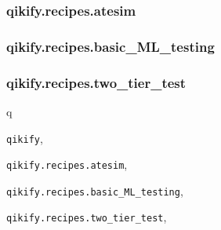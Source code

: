 \documentclass[letterpaper,10pt,english]{sphinxmanual}
\begin{document}
\subsubsection{qikify.recipes.atesim}
\label{generated/qikify.recipes.atesim:qikify-recipes-atesim}\label{generated/qikify.recipes.atesim::doc}\label{generated/qikify.recipes.atesim:module-qikify.recipes.atesim}

\subsubsection{qikify.recipes.basic\_ML\_testing}
\label{generated/qikify.recipes.basic_ML_testing:qikify-recipes-basic-ml-testing}\label{generated/qikify.recipes.basic_ML_testing:module-qikify.recipes.basic_ML_testing}\label{generated/qikify.recipes.basic_ML_testing::doc}

\subsubsection{qikify.recipes.two\_tier\_test}
\label{generated/qikify.recipes.two_tier_test:qikify-recipes-two-tier-test}\label{generated/qikify.recipes.two_tier_test:module-qikify.recipes.two_tier_test}\label{generated/qikify.recipes.two_tier_test::doc}

\renewcommand{\indexname}{Python Module Index}
\begin{theindex}
\def\bigletter#1{{\Large\sffamily#1}\nopagebreak\vspace{1mm}}
\bigletter{q}
\item {\texttt{qikify}}, \pageref{index:module-qikify}
\item {\texttt{qikify.recipes.atesim}}, \pageref{generated/qikify.recipes.atesim:module-qikify.recipes.atesim}
\item {\texttt{qikify.recipes.basic\_ML\_testing}}, \pageref{generated/qikify.recipes.basic_ML_testing:module-qikify.recipes.basic_ML_testing}
\item {\texttt{qikify.recipes.two\_tier\_test}}, \pageref{generated/qikify.recipes.two_tier_test:module-qikify.recipes.two_tier_test}
\end{theindex}

\renewcommand{\indexname}{Index}
\printindex
\end{document}
